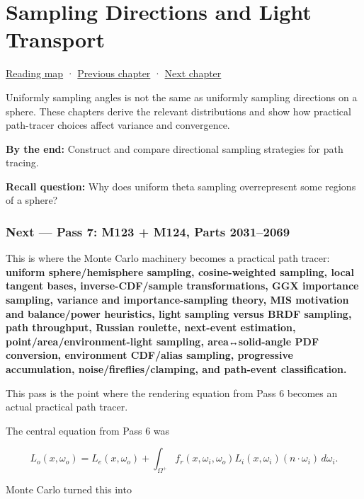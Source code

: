 \hypertarget{03-visual-computing-i-ch008}{}
\chapter{Sampling Directions and Light Transport}\label{03-visual-computing-i-ch008-sampling-directions-and-light-transport}

\hyperref[volume-reading-map]{Reading map} · \hyperref[03-visual-computing-i-ch007-the-rendering-equation-and-path-probabilities]{Previous chapter} · \hyperref[03-visual-computing-i-ch009-point-lights-mis-and-environment-lighting]{Next chapter}

Uniformly sampling angles is not the same as uniformly sampling directions on a sphere. These chapters derive the relevant distributions and show how practical path-tracer choices affect variance and convergence.

\textbf{By the end:} Construct and compare directional sampling strategies for path tracing.

\textbf{Recall question:} Why does uniform theta sampling overrepresent some regions of a sphere?

\subsection{Next --- Pass 7: M123 + M124, Parts 2031--2069}\label{03-visual-computing-i-ch008-next-pass-7-m123-m124-parts-20312069}

This is where the Monte Carlo machinery becomes a practical path tracer: \textbf{uniform sphere/hemisphere sampling, cosine-weighted sampling, local tangent bases, inverse-CDF/sample transformations, GGX importance sampling, variance and importance-sampling theory, MIS motivation and balance/power heuristics, light sampling versus BRDF sampling, path throughput, Russian roulette, next-event estimation, point/area/environment-light sampling, area↔solid-angle PDF conversion, environment CDF/alias sampling, progressive accumulation, noise/fireflies/clamping, and path-event classification.}

This pass is the point where the rendering equation from Pass 6 becomes an actual practical path tracer.

The central equation from Pass 6 was

\[
L_o(x,\omega_o)
=
L_e(x,\omega_o)
+
\int_{\Omega^+}
f_r(x,\omega_i,\omega_o)
L_i(x,\omega_i)
\left(n\cdot\omega_i\right)
\,d\omega_i.
\]

Monte Carlo turned this into

